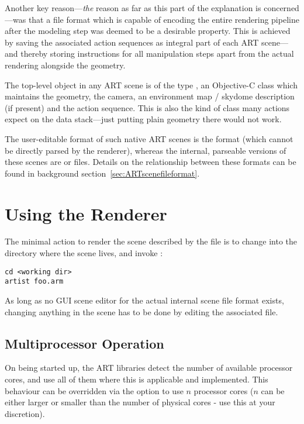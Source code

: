 Another key reason---\emph{the} reason as far as this part of the explanation is
concerned---was that a file format which is capable of encoding the entire
rendering pipeline after the modeling step was deemed to be a desirable
property. This is achieved by saving the associated action sequences as integral
part of each ART scene---and thereby storing instructions for all manipulation
steps apart from the actual rendering alongside the geometry.

The top-level object in any ART scene is of the type ,
an Objective-C class which maintains the geometry, the camera, an
environment map / skydome description (if present) and the action sequence. This is also
the kind of class many actions expect on the data stack---just putting
plain geometry there would not work.

The user-editable format of such native ART scenes is the
 format (which cannot be directly parsed by the
renderer), whereas the internal, parseable versions of these scenes
are  or  files. Details on the
relationship between these formats can be found in background
section~\ref{sec:ARTscenefileformat}.



\section{Using the Renderer}

The minimal action to render the scene described by the file  is to change into the directory where the scene  lives, and invoke :

\begin{verbatim}
cd <working dir>
artist foo.arm
\end{verbatim}

As long as no GUI scene editor for the actual internal  scene file format exists, changing anything in the scene has to be done by editing the associated  file. 

\subsection{Multiprocessor Operation}
On being started up, the ART libraries detect the number of available processor cores, and use all of them where this is applicable and implemented. This behaviour can be overridden via the option  to use $n$ processor cores ($n$ can be either larger or smaller than the number of physical cores - use this at your discretion).

